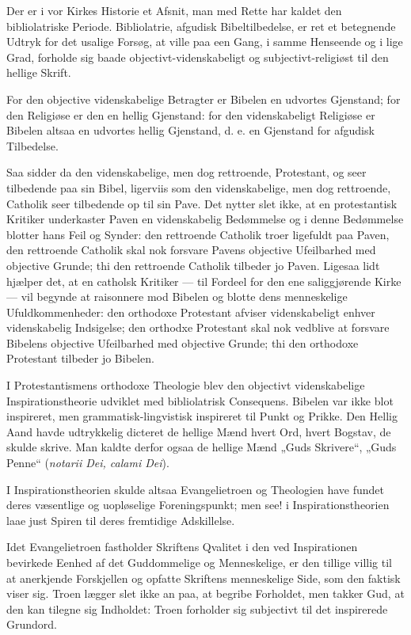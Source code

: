 \documentclass[12pt,a4paper]{book}
\newcommand{\opage}[1]{\marginnote{\footnotesize\textit{[#1]}}}
\begin{document}
Der er i vor Kirkes Historie et Afsnit, man med Rette har kaldet den
bibliolatriske Periode. Bibliolatrie, afgudisk Bibeltilbedelse, er
ret et betegnende Udtryk for det usalige Forsøg, at ville paa een
Gang, i samme Henseende og i lige Grad, forholde sig baade
objectivt-videnskabeligt og subjectivt-religiøst til den hellige
Skrift.

For den objective videnskabelige Betragter er Bibelen en
\opage{34} udvortes Gjenstand; for den Religiøse er den en hellig Gjenstand: for
den videnskabeligt Religiøse er Bibelen altsaa en udvortes hellig
Gjenstand, d. e. en Gjenstand for afgudisk Tilbedelse.

Saa sidder da den videnskabelige, men dog rettroende, Protestant, og
seer tilbedende paa sin Bibel, ligerviis som den videnskabelige, men
dog rettroende, Catholik seer tilbedende op til sin Pave. Det nytter
slet ikke, at en protestantisk Kritiker underkaster Paven en
videnskabelig Bedømmelse og i denne Bedømmelse blotter hans Feil og
Synder: den rettroende Catholik troer ligefuldt paa Paven, den
rettroende Catholik skal nok forsvare Pavens objective Ufeilbarhed
med objective Grunde; thi den rettroende Catholik tilbeder jo Paven.
Ligesaa lidt hjælper det, at en catholsk Kritiker --- til Fordeel for
den ene saliggjørende Kirke --- vil begynde at raisonnere mod Bibelen
og blotte dens menneskelige Ufuldkommenheder: den orthodoxe
Protestant afviser videnskabeligt enhver videnskabelig Indsigelse;
den orthodxe Protestant skal nok vedblive at forsvare Bibelens
objective Ufeilbarhed med objective Grunde; thi den orthodoxe
Protestant tilbeder jo Bibelen.

I Protestantismens orthodoxe Theologie blev den objectivt
videnskabelige Inspirationstheorie udviklet med bibliolatrisk
Consequens. Bibelen var ikke blot inspireret, men
grammatisk-lingvistisk inspireret til Punkt og Prikke. Den Hellig
Aand havde udtrykkelig dicteret de hellige Mænd hvert Ord, hvert
Bogstav, de skulde skrive. Man kaldte derfor ogsaa de hellige Mænd
„Guds Skrivere“, „Guds Penne“ (\textit{notarii Dei, calami Dei}).

I Inspirationstheorien skulde altsaa Evangelietroen og Theologien
have fundet deres væsentlige og uopløselige Foreningspunkt; men see!
i Inspirationstheorien laae just Spiren til deres fremtidige
Adskillelse.

Idet Evangelietroen fastholder Skriftens Qvalitet i den
\opage{35} ved Inspirationen bevirkede Eenhed af det Guddommelige og
Menneskelige, er den tillige villig til at anerkjende Forskjellen og
opfatte Skriftens menneskelige Side, som den faktisk viser sig. Troen
lægger slet ikke an paa, at begribe Forholdet, men takker Gud, at den
kan tilegne sig Indholdet: Troen forholder sig subjectivt til det
inspirerede Grundord.
\end{document}
